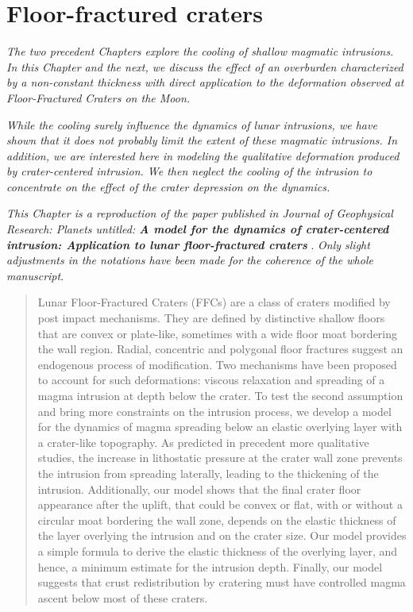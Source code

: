 \chapter{Floor-fractured craters}
\label{C5-chap6}

\textit{The  two precedent  Chapters  explore the  cooling of  shallow
  magmatic intrusions.  In  this Chapter and the next,  we discuss the
  effect of  an overburden  characterized by a  non-constant thickness
  with   direct   application   to   the   deformation   observed   at
  Floor-Fractured Craters on the Moon.}

\textit{While  the  cooling surely  influence  the  dynamics of  lunar
  intrusions, we have shown that it does not probably limit the extent
  of these magmatic  intrusions.  In addition, we  are interested here
  in modeling the qualitative  deformation produced by crater-centered
  intrusion.   We  then  neglect  the  cooling  of  the  intrusion  to
  concentrate  on  the   effect  of  the  crater   depression  on  the
  dynamics.}

\textit{  This Chapter  is a  reproduction of  the paper  published in
  Journal of Geophysical Research: Planets untitled: \textbf{A model
    for  the dynamics  of  crater-centered  intrusion: Application  to
    lunar     floor-fractured     craters}}     \citep{Thorey:2014cv}.
\textit{Only slight  adjustments in the  notations have been  made for
  the coherence of the whole manuscript}.

\minitoc

\begin{abstract}

  Lunar Floor-Fractured Craters (FFCs) are a class of craters modified
  by post impact mechanisms.  They  are defined by distinctive shallow
  floors that  are convex or  plate-like, sometimes with a  wide floor
  moat bordering  the wall  region.  Radial, concentric  and polygonal
  floor fractures  suggest an endogenous process  of modification. Two
  mechanisms  have been  proposed  to account  for such  deformations:
  viscous relaxation and spreading of a magma intrusion at depth below
  the crater. To test the second assumption and bring more constraints
  on the  intrusion process, we  develop a  model for the  dynamics of
  magma spreading below an elastic  overlying layer with a crater-like
  topography. As predicted in  precedent more qualitative studies, the
  increase in  lithostatic pressure at  the crater wall  zone prevents
  the intrusion from spreading laterally, leading to the thickening of
  the intrusion. Additionally,  our model shows that  the final crater
  floor appearance  after the  uplift, that could  be convex  or flat,
  with or without a circular moat  bordering the wall zone, depends on
  the elastic  thickness of the  layer overlying the intrusion  and on
  the crater size.  Our model provides  a simple formula to derive the
  elastic  thickness of  the  overlying layer,  and  hence, a  minimum
  estimate for the  intrusion depth. Finally, our  model suggests that
  crust redistribution by cratering  must have controlled magma ascent
  below most of these craters.

\end{abstract}

